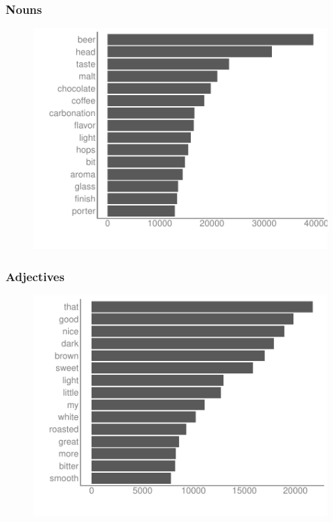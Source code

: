 \begin{frame}
    \frametitle{Nouns}
\begin{figure}[htb]
\includegraphics[scale=0.55,left]{img/figures/bar_nouns}
\end{figure}
\end{frame}

\begin{frame}
    \frametitle{Adjectives}
\begin{figure}[htb]
\includegraphics[scale=0.55,left]{img/figures/bar_adj}
\end{figure}
\end{frame}


